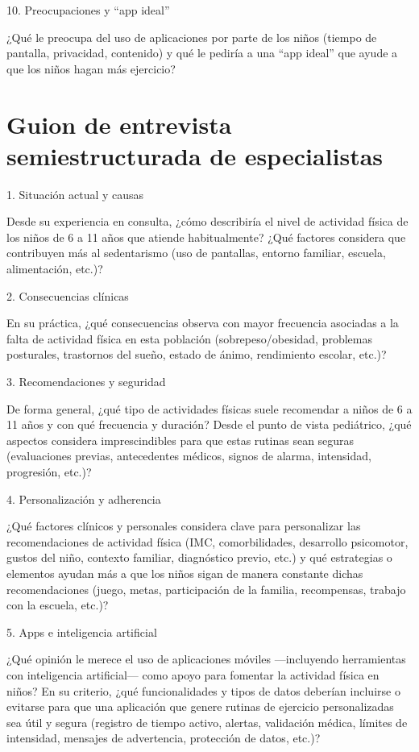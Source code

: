 		10. Preocupaciones y ``app ideal''
		
		¿Qué le preocupa del uso de aplicaciones por parte de los niños (tiempo de pantalla, privacidad, contenido) y qué le pediría a una ``app ideal'' que ayude a que los niños hagan más ejercicio?
		
	\section{Guion de entrevista semiestructurada de especialistas}
	\label{app:guion_enter}
		1.	Situación actual y causas
		
		Desde su experiencia en consulta, ¿cómo describiría el nivel de actividad física de los niños de 6 a 11 años que atiende habitualmente? ¿Qué factores considera que contribuyen más al sedentarismo (uso de pantallas, entorno familiar, escuela, alimentación, etc.)?
		
		2.	Consecuencias clínicas
		
		En su práctica, ¿qué consecuencias observa con mayor frecuencia asociadas a la falta de actividad física en esta población (sobrepeso/obesidad, problemas posturales, trastornos del sueño, estado de ánimo, rendimiento escolar, etc.)?
		
		3.	Recomendaciones y seguridad
		
		De forma general, ¿qué tipo de actividades físicas suele recomendar a niños de 6 a 11 años y con qué frecuencia y duración? Desde el punto de vista pediátrico, ¿qué aspectos considera imprescindibles para que estas rutinas sean seguras (evaluaciones previas, antecedentes médicos, signos de alarma, intensidad, progresión, etc.)?
		
		4.	Personalización y adherencia
		
		¿Qué factores clínicos y personales considera clave para personalizar las recomendaciones de actividad física (IMC, comorbilidades, desarrollo psicomotor, gustos del niño, contexto familiar, diagnóstico previo, etc.) y qué estrategias o elementos ayudan más a que los niños sigan de manera constante dichas recomendaciones (juego, metas, participación de la familia, recompensas, trabajo con la escuela, etc.)?
		
		5.	Apps e inteligencia artificial
		
		¿Qué opinión le merece el uso de aplicaciones móviles ---incluyendo herramientas con inteligencia artificial--- como apoyo para fomentar la actividad física en niños? En su criterio, ¿qué funcionalidades y tipos de datos deberían incluirse o evitarse para que una aplicación que genere rutinas de ejercicio personalizadas sea útil y segura (registro de tiempo activo, alertas, validación médica, límites de intensidad, mensajes de advertencia, protección de datos, etc.)?

